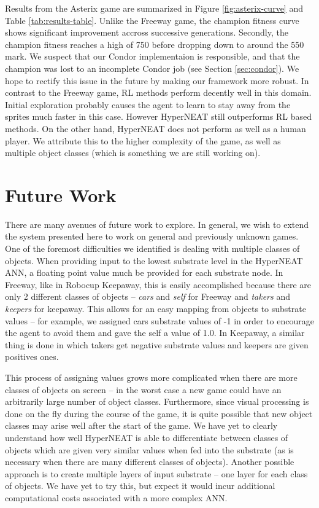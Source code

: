 \documentclass{acm_proc_article-sp}
\begin{document}
Results from the Asterix game are summarized in Figure \ref{fig:asterix-curve} and Table \ref{tab:results-table}. Unlike the Freeway game, the champion fitness curve shows significant improvement accross successive generations. Secondly, the champion fitness reaches a high of 750 before dropping down to around the 550 mark. We suspect that our Condor implementaion is responsible, and that the champion was lost to an incomplete Condor job (see Section \ref{sec:condor}). We hope to rectify this issue in the future by making our framework more robust. In contrast to the Freeway game, RL methods perform decently well in this domain. Initial exploration probably causes the agent to learn to stay away from the sprites much faster in this case. However HyperNEAT still outperforms RL based methods. On the other hand, HyperNEAT does not perform as well as a human player. We attribute this to the higher complexity of the game, as well as multiple object classes (which is something we are still working on). 

\section{Future Work}
\label{sec:futurework}
There are many avenues of future work to explore. In general, we wish to extend the system presented here to work on general and previously unknown games. One of the foremost difficulties we identified is dealing with multiple classes of objects. When providing input to the lowest substrate level in the HyperNEAT ANN, a floating point value much be provided for each substrate node. In Freeway, like in Robocup Keepaway, this is easily accomplished because there are only 2 different classes of objects -- \textit{cars} and \textit{self} for Freeway and \textit{takers} and \textit{keepers} for keepaway. This allows for an easy mapping from objects to substrate values -- for example, we assigned cars substrate values of -1 in order to encourage the agent to avoid them and gave the self a value of 1.0. In Keepaway, a similar thing is done in which takers get negative substrate values and keepers are given positives ones. 

This process of assigning values grows more complicated when there are more classes of objects on screen -- in the worst case a new game could have an arbitrarily large number of object classes. Furthermore, since visual processing is done on the fly during the course of the game, it is quite possible that new object classes may arise well after the start of the game. We have yet to clearly understand how well HyperNEAT is able to differentiate between classes of objects which are given very similar values when fed into the substrate (as is necessary when there are many different classes of objects). Another possible approach is to create multiple layers of input substrate -- one layer for each class of objects. We have yet to try this, but expect it would incur additional computational costs associated with a more complex ANN.
\end{document}
